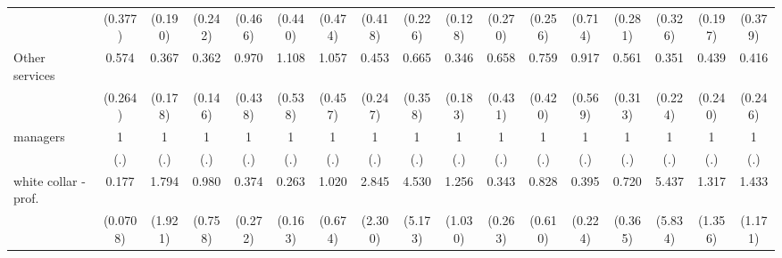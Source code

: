 {\begin{tabular}{l*{16}{c}}
                    &     (0.377)         &     (0.190)         &     (0.242)         &     (0.466)         &     (0.440)         &     (0.474)         &     (0.418)         &     (0.226)         &     (0.128)         &     (0.270)         &     (0.256)         &     (0.714)         &     (0.281)         &     (0.326)         &     (0.197)         &     (0.379)         \\
[1em]
Other services      &       0.574         &       0.367\sym{*}  &       0.362\sym{*}  &       0.970         &       1.108         &       1.057         &       0.453         &       0.665         &       0.346\sym{*}  &       0.658         &       0.759         &       0.917         &       0.561         &       0.351         &       0.439         &       0.416         \\
                    &     (0.264)         &     (0.178)         &     (0.146)         &     (0.438)         &     (0.538)         &     (0.457)         &     (0.247)         &     (0.358)         &     (0.183)         &     (0.431)         &     (0.420)         &     (0.569)         &     (0.313)         &     (0.224)         &     (0.240)         &     (0.246)         \\
[1em]
managers            &           1         &           1         &           1         &           1         &           1         &           1         &           1         &           1         &           1         &           1         &           1         &           1         &           1         &           1         &           1         &           1         \\
                    &         (.)         &         (.)         &         (.)         &         (.)         &         (.)         &         (.)         &         (.)         &         (.)         &         (.)         &         (.)         &         (.)         &         (.)         &         (.)         &         (.)         &         (.)         &         (.)         \\
[1em]
white collar - prof.&       0.177\sym{***}&       1.794         &       0.980         &       0.374         &       0.263\sym{*}  &       1.020         &       2.845         &       4.530         &       1.256         &       0.343         &       0.828         &       0.395         &       0.720         &       5.437         &       1.317         &       1.433         \\
                    &    (0.0708)         &     (1.921)         &     (0.758)         &     (0.272)         &     (0.163)         &     (0.674)         &     (2.300)         &     (5.173)         &     (1.030)         &     (0.263)         &     (0.610)         &     (0.224)         &     (0.365)         &     (5.834)         &     (1.356)         &     (1.171)         \\

\end{tabular}}
